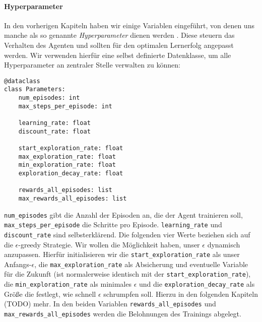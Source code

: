 \paragraph{Hyperparameter} \label{sec:qLearningHyperparameter}
In den vorherigen Kapiteln haben wir einige Variablen eingeführt, von denen uns manche als so genannte \textit{Hyperparameter} dienen werden \cite{08_ravichandiran2018hands}. Diese steuern das Verhalten des Agenten und sollten für den optimalen Lernerfolg angepasst werden. Wir verwenden hierfür eine selbst definierte Datenklasse, um alle Hyperparameter an zentraler Stelle verwalten zu können:
\begin{verbatim}
@dataclass
class Parameters:
    num_episodes: int
    max_steps_per_episode: int

    learning_rate: float
    discount_rate: float

    start_exploration_rate: float
    max_exploration_rate: float
    min_exploration_rate: float
    exploration_decay_rate: float

    rewards_all_episodes: list
    max_rewards_all_episodes: list
\end{verbatim}
\texttt{num_episodes} gibt die Anzahl der Episoden an, die der Agent trainieren soll, \linebreak\texttt{max_steps_per_episode} die Schritte pro Episode. \texttt{learning_rate} und \texttt{discount_rate} sind selbsterklärend. Die folgenden vier Werte beziehen sich auf die $ \epsilon $-greedy Strategie. Wir wollen die Möglichkeit haben, unser $ \epsilon $ dynamisch anzupassen. Hierfür initialisieren wir die \texttt{start_exploration_rate} als unser Anfangs-$ \epsilon $, die \texttt{max_exploration_rate} als Absicherung und eventuelle Variable für die Zukunft (ist normalerweise identisch mit der \texttt{start_exploration_rate}), die \texttt{min_exploration_rate} als minimales $ \epsilon $ und die \texttt{exploration_decay_rate} als Größe die festlegt, wie schnell $ \epsilon $ schrumpfen soll. Hierzu in den folgenden Kapiteln (TODO) mehr. In den beiden Variablen \texttt{rewards_all_episodes} und \texttt{max_rewards_all_episodes} werden die Belohnungen des Trainings abgelegt.

